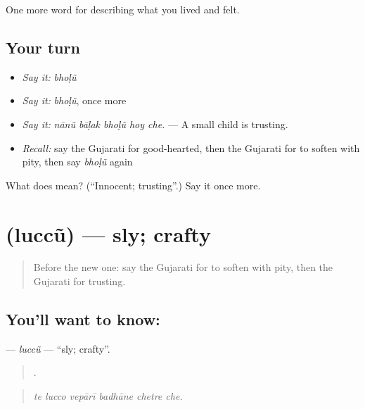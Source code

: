 \begin{grammarlens}[title={What you've built}]
One more word for describing what you lived and felt.
\end{grammarlens}

\subsection*{Your turn}
\begin{itemize}
\raggedright
  \item \emph{Say it:} \emph{bhoḷũ}
  \item \emph{Say it:} \emph{bhoḷũ}, once more
  \item \emph{Say it:} \emph{nānũ bāḷak bhoḷũ hoy che.} — A small child is trusting.
  \item \emph{Recall:} say the Gujarati for good-hearted, then the Gujarati for to soften with pity, then say \emph{bhoḷũ} again
\end{itemize}

\begin{tcolorbox}[breakable,colback=teal!4,colframe=teal!35!black,title={Before you move on}]
What does  mean? (\textquotedblleft{}Innocent; trusting\textquotedblright{}.) Say it once more.
\end{tcolorbox}
\section[\texorpdfstring{\gu{લુચ્ચું} (luccũ)}{લુચ્ચું (luccũ)}]{ (luccũ) — sly; crafty}

\label{lesson:GU-C460-luccu}



\begin{quote}
Before the new one: say the Gujarati for to soften with pity, then the Gujarati for trusting.
\end{quote}

\subsection*{You'll want to know: }
\textbf{} — \emph{luccũ} — \textquotedblleft{}sly; crafty\textquotedblright{}.

\begin{quote}
     .
\end{quote}

\begin{quote}
\emph{te lucco vepārī badhāne chetre che.}
\end{quote}

